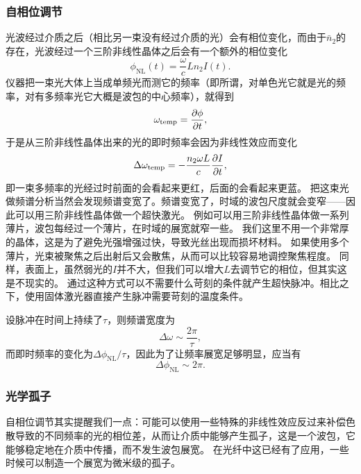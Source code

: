 \subsubsection{自相位调节}

光波经过介质之后（相比另一束没有经过介质的光）会有相位变化，而由于$\bar{n}_2$的存在，光波经过一个三阶非线性晶体之后会有一个额外的相位变化
\begin{equation}
    \phi_\text{NL}(t) = \frac{\omega}{c} L n_2 I(t).
    \label{eq:self-phase-adjustement}
\end{equation}
仪器把一束光大体上当成单频光而测它的频率（即所谓，对单色光它就是光的频率，对有多频率光它大概是波包的中心频率），就得到
\[
    \omega_\text{temp} = \pdv{\phi}{t},
\]
于是从三阶非线性晶体出来的光的即时频率会因为非线性效应而变化
\begin{equation}
    \Delta \omega_\text{temp} = - \frac{n_2 \omega L}{c} \pdv{I}{t},
    \label{eq:temp-phase-change}
\end{equation}
即一束多频率的光经过时前面的会看起来更红，后面的会看起来更蓝。
把这束光做频谱分析当然会发现频谱变宽了。频谱变宽了，时域的波包尺度就会变窄——因此可以用三阶非线性晶体做一个超快激光。
例如可以用三阶非线性晶体做一系列薄片，波包每经过一个薄片，在时域的展宽就窄一些。
我们这里不用一个非常厚的晶体，这是为了避免光强增强过快，导致光丝出现而损坏材料。
如果使用多个薄片，光束被聚焦之后出射后又会散焦，从而可以比较容易地调控聚焦程度。
同样，表面上，虽然弱光的$I$并不大，但我们可以增大$L$去调节它的相位，但其实这是不现实的。
通过这种方式可以不需要什么苛刻的条件就产生超快脉冲。相比之下，使用固体激光器直接产生脉冲需要苛刻的温度条件。

设脉冲在时间上持续了$\tau$，则频谱宽度为
\[
    \Delta \omega \sim \frac{2\pi}{\tau},
\]
而即时频率的变化为$\Delta \phi_\text{NL} / \tau$，因此为了让频率展宽足够明显，应当有
\begin{equation}
    \Delta \phi_\text{NL} \sim 2\pi.
\end{equation}

\subsubsection{光学孤子}

自相位调节其实提醒我们一点：可能可以使用一些特殊的非线性效应反过来补偿色散导致的不同频率的光的相位差，从而让介质中能够产生孤子，这是一个波包，它能够稳定地在介质中传播，而不发生波包展宽。
在光纤中这已经有了应用，一些时候可以制造一个展宽为微米级的孤子。

